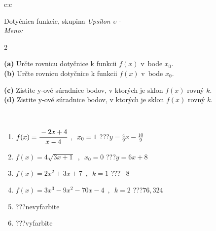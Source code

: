 \documentclass[10pt]{report}
\begin{document}
\begin{tabular}{c:c}
\begin{minipage}[c][104.5mm][t]{0.5\linewidth}
\begin{center}
\vspace{7mm}
{\huge Dotyčnica funkcie, skupina \textit{Upsilon $\upsilon$} -}\\[5mm]
\textit{Meno:}\phantom{xxxxxxxxxxxxxxxxxxxxxxxxxxxxxxxxxxxxxxxxxxxxxxxxxxxxxxxxxxxxxxxxx}\\[5mm]
\begin{minipage}{0.95\linewidth}
\begin{center}
{\small \begin{multicols}{2} \raggedright
\textbf{(a)} Určte rovnicu dotyčnice k funkcii \(f(x)\) v~bode \(x_0\). \\[1mm]
\textbf{(b)} Určte rovnicu dotyčnice k funkcii \(f(x)\) v~bode \(x_0\). \par \columnbreak
\textbf{(c)} Zistite y-ové súradnice bodov, v ktorých je sklon \(f(x)\) rovný \(k\). \\[1mm]
\textbf{(d)} Zistite y-ové súradnice bodov, v ktorých je sklon \(f(x)\) rovný \(k\). \\[1mm]
\end{multicols}
}
\end{center}
\end{minipage}
\\[4mm]
\begin{minipage}{0.79\linewidth}
\begin{center}
\begin{varwidth}{\linewidth}
\begin{enumerate}
\normalsizerr
\item $f(x)=\cfrac{-2x+4}{x-4}\enspace , \enspace x_0=1$\quad \dotfill\; ???\;\dotfill \quad $y = \frac{4}{9}x-\frac{10}{9}$
\item $f(x)=4\sqrt{3x+1}\enspace , \enspace x_0=0$\quad \dotfill\; ???\;\dotfill \quad $y = 6x+8$
\item $f(x)=2x^2+3x+7\enspace , \enspace k=1$\quad \dotfill\; ???\;\dotfill \quad $-8$
\item $f(x)=3x^3-9x^2-70x-4\enspace , \enspace k=2$\quad \dotfill\; ???\;\dotfill \quad $76 , 324$
\item \quad \dotfill\; ???\;\dotfill \quad nevyfarbite
\item \quad \dotfill\; ???\;\dotfill \quad vyfarbite
\end{enumerate}
\end{varwidth}
\end{center}

\end{minipage}
\end{center}
\end{minipage}
\end{tabular}
\end{document}
